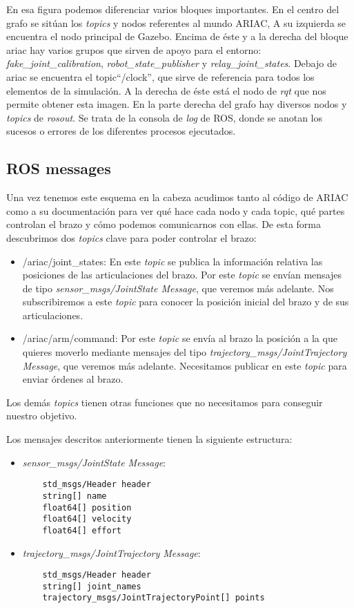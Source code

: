 En esa figura podemos diferenciar varios bloques importantes. En el centro del grafo se sitúan los \textit{topics} y nodos referentes al mundo ARIAC, A su izquierda se encuentra el nodo principal de Gazebo. Encima de éste y a la derecha del bloque ariac hay varios grupos que sirven de apoyo para el entorno: \textit{fake\_joint\_calibration}, \textit{robot\_state\_publisher} y \textit{relay\_joint\_states}.
Debajo de ariac se encuentra el topic“/clock”, que sirve de referencia para todos los elementos de la simulación. A la derecha de éste está el nodo de \textit{rqt} que nos permite obtener esta imagen. En la parte derecha del grafo hay diversos nodos y \textit{topics} de \textit{rosout}. Se trata de la consola de \textit{log} de ROS, donde se anotan los sucesos o errores de los diferentes procesos ejecutados.

\subsection{ROS messages}
\label{subsec:br_rosmessages}

Una vez tenemos este esquema en la cabeza acudimos tanto al código de ARIAC como a su documentación para ver qué hace cada nodo y cada topic, qué partes controlan el brazo y cómo podemos comunicarnos con ellas. De esta forma descubrimos dos \textit{topics} clave para poder controlar el brazo:
\begin{itemize}
	\item /ariac/joint\_states: En este \textit{topic} se publica la información relativa las posiciones de las articulaciones del brazo. Por este \textit{topic} se envían mensajes de tipo \textit{sensor\_msgs/JointState Message}, que veremos más adelante. Nos subscribiremos a este \textit{topic} para conocer la posición inicial del brazo y de sus articulaciones.
	
	\item /ariac/arm/command: Por este \textit{topic} se envía al brazo la posición a la que quieres moverlo mediante mensajes del tipo \textit{trajectory\_msgs/JointTrajectory Message}, que veremos más adelante. Necesitamos publicar en este \textit{topic} para enviar órdenes al brazo.
	
\end{itemize}

Los demás \textit{topics} tienen otras funciones que no necesitamos para conseguir nuestro objetivo.

Los mensajes descritos anteriormente tienen la siguiente estructura:
\begin{itemize}
	\item \textit{sensor\_msgs/JointState Message}:
	\begin{lstlisting}
	std_msgs/Header header
	string[] name
	float64[] position
	float64[] velocity
	float64[] effort
	\end{lstlisting}
	\item \textit{trajectory\_msgs/JointTrajectory Message}:
	\begin{lstlisting}
	std_msgs/Header header
	string[] joint_names
	trajectory_msgs/JointTrajectoryPoint[] points
	\end{lstlisting}
\end{itemize}

